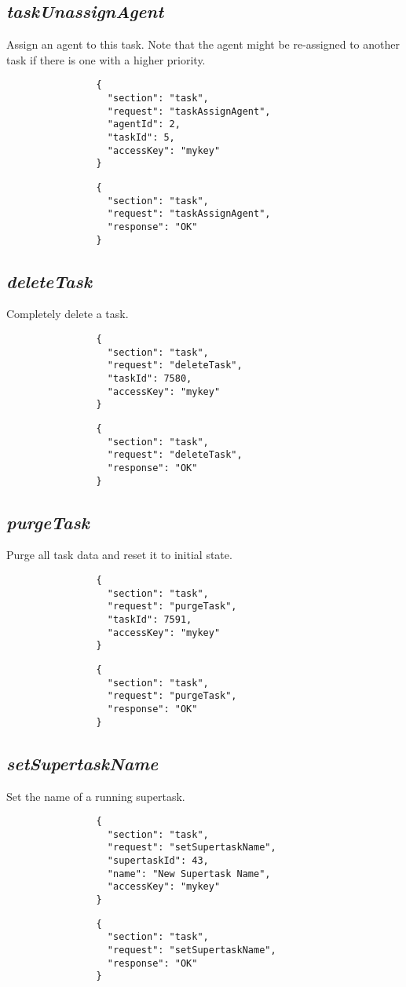 		\subsection*{\textit{taskUnassignAgent}}
			Assign an agent to this task. Note that the agent might be re-assigned to another task if there is one with a higher priority.
			{
				\color{blue}
				\begin{verbatim}
				{
				  "section": "task",
				  "request": "taskAssignAgent",
				  "agentId": 2,
				  "taskId": 5,
				  "accessKey": "mykey"
				}
				\end{verbatim}
			}
			{
				\color{OliveGreen}
				\begin{verbatim}
				{
				  "section": "task",
				  "request": "taskAssignAgent",
				  "response": "OK"
				}
				\end{verbatim}
			}
		\subsection*{\textit{deleteTask}}
			Completely delete a task.
			{
				\color{blue}
				\begin{verbatim}
				{
				  "section": "task",
				  "request": "deleteTask",
				  "taskId": 7580,
				  "accessKey": "mykey"
				}
				\end{verbatim}
			}
			{
				\color{OliveGreen}
				\begin{verbatim}
				{
				  "section": "task",
				  "request": "deleteTask",
				  "response": "OK"
				}
				\end{verbatim}
			}		
		\subsection*{\textit{purgeTask}}
			Purge all task data and reset it to initial state.
			{
				\color{blue}
				\begin{verbatim}
				{
				  "section": "task",
				  "request": "purgeTask",
				  "taskId": 7591,
				  "accessKey": "mykey"
				}
				\end{verbatim}
			}
			{
				\color{OliveGreen}
				\begin{verbatim}
				{
				  "section": "task",
				  "request": "purgeTask",
				  "response": "OK"
				}
				\end{verbatim}
			}
		\subsection*{\textit{setSupertaskName}}
			Set the name of a running supertask.
			{
				\color{blue}
				\begin{verbatim}
				{
				  "section": "task",
				  "request": "setSupertaskName",
				  "supertaskId": 43,
				  "name": "New Supertask Name",
				  "accessKey": "mykey"
				}
				\end{verbatim}
			}
			{
				\color{OliveGreen}
				\begin{verbatim}
				{
				  "section": "task",
				  "request": "setSupertaskName",
				  "response": "OK"
				}
				\end{verbatim}
			}
